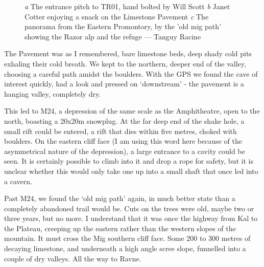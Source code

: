 \begin{figure}[t!]
\checkoddpage \ifoddpage \forcerectofloat \else \forceversofloat \fi
    \centering
    \begin{subfigure}[t]{0.59\textwidth}
        \centering
        \caption{} \label{Will Scott bolting}
    \end{subfigure}
    \hfill
    \begin{subfigure}[t]{0.393\textwidth}
        \centering
        \caption{} \label{Ice}
    \end{subfigure}

    \vspace{0.3cm}
    \begin{subfigure}[t]{\textwidth}
    \centering
        \caption{} \label{Panorama}
    \end{subfigure}
    \caption{
    \emph{a} The entrance pitch to TR01, hand bolted by Will Scott
    \emph{b} Janet Cotter enjoying a snack on the Limestone Pavement
    \emph{c} The panorama from the Eastern Promontory, by the 'old mig path' showing the Razor alp and the refuge --- Tanguy Racine }
\end{figure}


The Pavement was as I remembered, bare limestone beds, deep shady cold pits exhaling their cold breath. We kept to the northern, deeper end of the valley, choosing a careful path amidst the boulders. With the GPS we found the cave of interest quickly, had a look and pressed on ‘downstream’ - the pavement is a hanging valley, completely dry. 

This led to M24, a depression of the same scale as the Amphitheatre, open to the north, boasting a 20x20m snowplug. At the far deep end of the shake hole, a small rift could be entered, a rift that dies within five metres, choked with boulders. On the eastern cliff face  (I am using this word here because of the asymmetrical nature of the depression), a large entrance to a cavity could be seen. It is certainly possible to climb into it and drop a rope for safety, but it is unclear whether this would only take one up into a small shaft that once led into a cavern. 

Past M24, we found the ‘old mig path’ again, in much better state than a completely abandoned trail would be. Cuts on the trees were old, maybe two or three years, but no more. I understand that it was once the highway from Kal to the Plateau, creeping up the eastern rather than the western slopes of the mountain. It must cross the Mig southern cliff face. Some 200 to 300 metres of decaying limestone, and underneath a high angle scree slope, funnelled into a couple of dry valleys. All the way to Ravne. 

